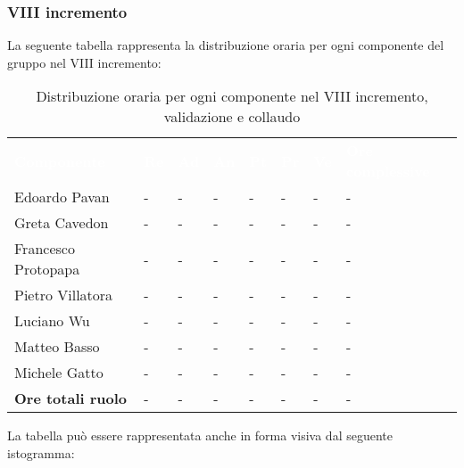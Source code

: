 \subsubsection{VIII incremento}
La seguente tabella rappresenta la distribuzione oraria per ogni componente del gruppo nel VIII incremento:
\begin{table}[!htbp]
\begin{center}
\renewcommand{\arraystretch}{1.25}
\begin{tabular}{ m{}<{\centering}  m{}<{\centering} m{}<{\centering} m{}<{\centering}  m{}<{\centering}  m{}<{\centering}  m{}<{\centering}  m{}<{\centering}   }
	\rowcolor{darkblue}
	\textcolor{white}{\textbf{Componente}} &\textcolor{white}{\textbf{Re}}&\textcolor{white}{\textbf{Ad}}&\textcolor{white}{\textbf{An}}&\textcolor{white}{\textbf{Pt}}&\textcolor{white}{\textbf{Pr}}&\textcolor{white}{\textbf{Ve}}&\textcolor{white}{\textbf{Ore complessive}}\\ 

	Edoardo Pavan & - & - & - & - & - & - & -\\	

	Greta Cavedon & - & - & - & - & - & - & -\\
	
	Francesco Protopapa & - & - & - & - & - & - & -\\
	
	Pietro Villatora & - & - & - & - & - & - & -\\
	
	Luciano Wu & - & - & - & - & - & - & -\\
	
	Matteo Basso & - & - & - & - & - & - & -\\
	
	Michele Gatto & - & - & - & - & - & - & -\\
	
	\textbf{Ore totali ruolo} & - & - & - & - & - & - & -\\

\end{tabular}
\caption{Distribuzione oraria per ogni componente nel VIII incremento,  validazione e collaudo}
\end{center}
\end{table}

La tabella può essere rappresentata anche in forma visiva dal seguente istogramma:

